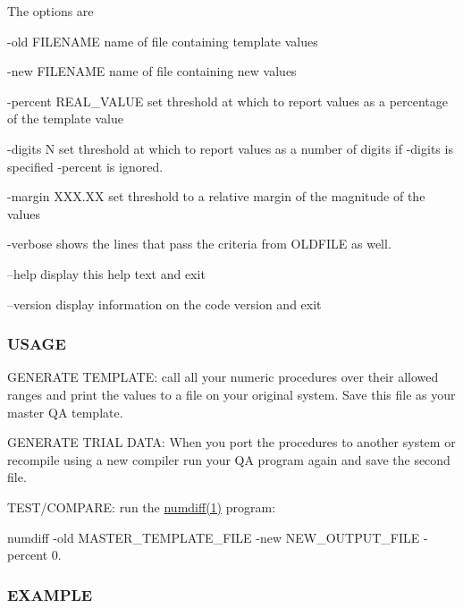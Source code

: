 The options are

-\/old F\+I\+L\+E\+N\+A\+ME name of file containing template values

-\/new F\+I\+L\+E\+N\+A\+ME name of file containing new values

-\/percent R\+E\+A\+L\+\_\+\+V\+A\+L\+UE set threshold at which to report values as a percentage of the template value

-\/digits N set threshold at which to report values as a number of digits if -\/digits is specified -\/percent is ignored.

-\/margin X\+X\+X.\+XX set threshold to a relative margin of the magnitude of the values

-\/verbose shows the lines that pass the criteria from O\+L\+D\+F\+I\+LE as well.

--help display this help text and exit

--version display information on the code version and exit

\subsubsection*{U\+S\+A\+GE}


\begin{DoxyEnumerate}
\item G\+E\+N\+E\+R\+A\+TE T\+E\+M\+P\+L\+A\+TE\+: call all your numeric procedures over their allowed ranges and print the values to a file on your original system. Save this file as your master QA template.
\item G\+E\+N\+E\+R\+A\+TE T\+R\+I\+AL D\+A\+TA\+: When you port the procedures to another system or recompile using a new compiler run your QA program again and save the second file.
\item T\+E\+S\+T/\+C\+O\+M\+P\+A\+RE\+: run the \hyperlink{what__overview_81_8txt_a7d9f0f7f68d767709cf298ae59490237}{numdiff(1)} program\+:

numdiff -\/old M\+A\+S\+T\+E\+R\+\_\+\+T\+E\+M\+P\+L\+A\+T\+E\+\_\+\+F\+I\+LE -\/new N\+E\+W\+\_\+\+O\+U\+T\+P\+U\+T\+\_\+\+F\+I\+LE -\/percent 0.
\end{DoxyEnumerate}

\subsubsection*{E\+X\+A\+M\+P\+LE}

